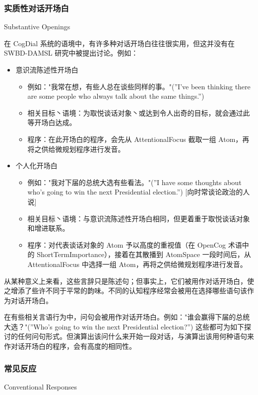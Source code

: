 \subsubsection{实质性对话开场白}{Substantive Openings}

在 CogDial 系统的语境中，有许多种对话开场白往往很实用，但这并没有在 SWBD-DAMSL 研究中被提出讨论。例如：

\begin{itemize}
\item 意识流陈述性开场白
\begin{itemize}
\item 例如："我常在想，有些人总在谈些同样的事。"(”I’ve been thinking there are some people who always talk about the same things.”)
\item 相关目标丶语境：为取悦谈话对象丶或达到令人出奇的目标，就会通过此等开场白达成。
\item 程序：在此开场白的程序，会先从 AttentionalFocus 截取一组 Atom，再将之供给微规划程序进行发音。
\end{itemize}
\item 个人化开场白
\begin{itemize}
\item 例如："我对下届的总统大选有些看法。"(”I have some thoughts about who’s going to win the next Presidential election.”) [向时常谈论政治的人说]
\item 相关目标丶语境：与意识流陈述性开场白相同，但更着重于取悦谈话对象和增进联系。 
\item 程序：对代表谈话对象的 Atom 予以高度的重视值（在 OpenCog 术语中的 ShortTermImportance），接着在其散播到 AtomSpace 一段时间后，从 AttentionalFocus 中选择一组 Atom，再将之供给微规划程序进行发音。
\end{itemize}
\end{itemize}

从某种意义上来看，这些言辞只是陈述句；但事实上，它们被用作对话开场白，使之增添了些许不同于平常的韵味。不同的认知程序经常会被用在选择哪些语句该作为对话开场白。 

在有些相关言语行为中，问句会被用作对话开场白。例如："谁会赢得下届的总统大选？"(”Who’s going to win the next Presidential election?”) 这些都可为如下探讨的任何问句形式。但演算出该问什么来开始一段对话，与演算出该用何种语句来作对话开场白的程序，会有高度的相同性。

\subsubsection{常见反应}{Conventional Responses}

